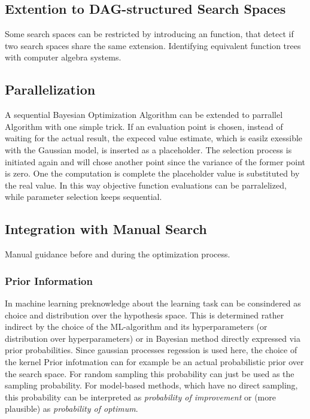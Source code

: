 \documentclass[english]{article}
\begin{document}
\subsection{Extention to DAG-structured Search Spaces}
Some search spaces can be restricted by introducing an function, that detect if two search spaces share the same extension.
Identifying equivalent function trees with computer algebra systems.

\subsection{Parallelization}
A sequential Bayesian Optimization Algorithm can be extended to parrallel Algorithm with one simple trick. If an evaluation point is chosen, instead of waiting for the actual result, the expeced value estimate, which is easilz exessible with the Gaussian model, is inserted as a placeholder. The selection process is initiated again and will chose another point since the variance of the former point is zero. One the computation is complete the placeholder value is substituted by the real value. In this way objective function evaluations can be parralelized, while parameter selection keeps sequential.


\subsection{Integration with Manual Search}
Manual guidance before and during the optimization process.

\subsubsection*{Prior Information}
In machine learning preknowledge about the learning task can be consindered as choice and distribution over the hypothesis space. This is determined rather indirect by the choice of the \ac{ML}-algorithm and its hyperparameters (or distribution over hyperparameters) or in Bayesian method directly expressed via prior probabilities. Since gaussian processes regession is used here, the choice of the kernel
Prior infotmation can for example be an actual probabilistic prior over the search space. For random sampling this probability can just be used as the sampling probability. For model-based methods, which have no direct sampling, this probability can be interpreted as \textit{probability of improvement} or (more plausible) as \textit{probability of optimum}.
\end{document}
